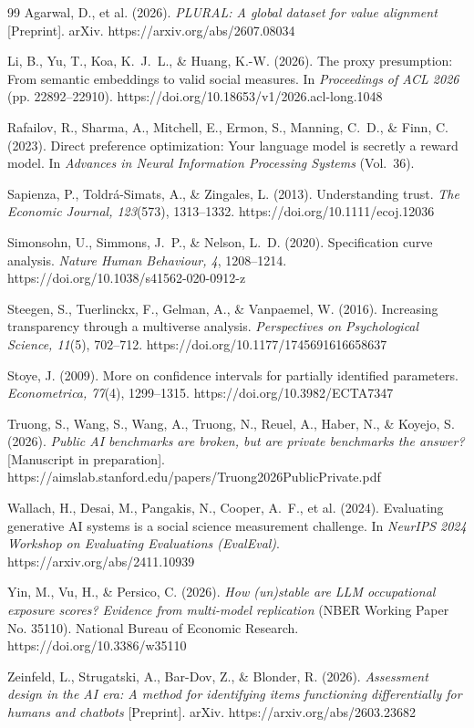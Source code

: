 \documentclass[10pt,letterpaper]{article}
\begin{document}
\begin{thebibliography}{99}
 Agarwal, D., et al. (2026). \textit{PLURAL: A global dataset for value alignment} [Preprint]. arXiv. https://arxiv.org/abs/2607.08034

 Li, B., Yu, T., Koa, K.~J.~L., \& Huang, K.-W. (2026). The proxy presumption: From semantic embeddings to valid social measures. In \textit{Proceedings of ACL 2026} (pp. 22892--22910). https://doi.org/10.18653/v1/2026.acl-long.1048

 Rafailov, R., Sharma, A., Mitchell, E., Ermon, S., Manning, C.~D., \& Finn, C. (2023). Direct preference optimization: Your language model is secretly a reward model. In \textit{Advances in Neural Information Processing Systems} (Vol.~36).

 Sapienza, P., Toldr\'a-Simats, A., \& Zingales, L. (2013). Understanding trust. \textit{The Economic Journal, 123}(573), 1313--1332. https://doi.org/10.1111/ecoj.12036

 Simonsohn, U., Simmons, J.~P., \& Nelson, L.~D. (2020). Specification curve analysis. \textit{Nature Human Behaviour, 4}, 1208--1214. https://doi.org/10.1038/s41562-020-0912-z

 Steegen, S., Tuerlinckx, F., Gelman, A., \& Vanpaemel, W. (2016). Increasing transparency through a multiverse analysis. \textit{Perspectives on Psychological Science, 11}(5), 702--712. https://doi.org/10.1177/1745691616658637

 Stoye, J. (2009). More on confidence intervals for partially identified parameters. \textit{Econometrica, 77}(4), 1299--1315. https://doi.org/10.3982/ECTA7347

 Truong, S., Wang, S., Wang, A., Truong, N., Reuel, A., Haber, N., \& Koyejo, S. (2026). \textit{Public AI benchmarks are broken, but are private benchmarks the answer?} [Manuscript in preparation]. https://aimslab.stanford.edu/papers/Truong2026PublicPrivate.pdf

 Wallach, H., Desai, M., Pangakis, N., Cooper, A.~F., et al. (2024). Evaluating generative AI systems is a social science measurement challenge. In \textit{NeurIPS 2024 Workshop on Evaluating Evaluations (EvalEval)}. https://arxiv.org/abs/2411.10939

 Yin, M., Vu, H., \& Persico, C. (2026). \textit{How (un)stable are LLM occupational exposure scores? Evidence from multi-model replication} (NBER Working Paper No. 35110). National Bureau of Economic Research. https://doi.org/10.3386/w35110

 Zeinfeld, L., Strugatski, A., Bar-Dov, Z., \& Blonder, R. (2026). \textit{Assessment design in the AI era: A method for identifying items functioning differentially for humans and chatbots} [Preprint]. arXiv. https://arxiv.org/abs/2603.23682

\end{thebibliography}
\end{document}
